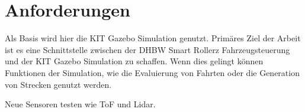 \section{Anforderungen}
Als Basis wird hier die KIT Gazebo Simulation genutzt.
Primäres Ziel der Arbeit ist es eine Schnittstelle zwischen der DHBW Smart Rollerz Fahrzeugsteuerung und der KIT Gazebo Simulation zu schaffen.
Wenn dies gelingt können Funktionen der Simulation, wie die Evaluierung von Fahrten oder die Generation von Strecken genutzt werden.

Neue Sensoren testen wie ToF und Lidar.

